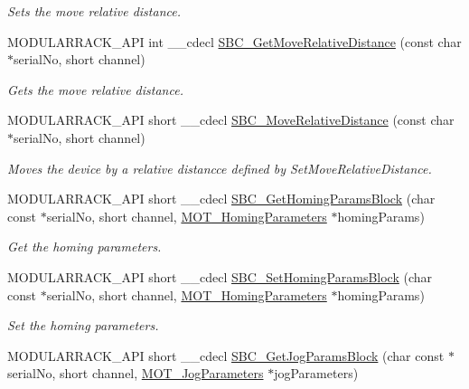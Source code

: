 \begin{DoxyCompactItemize}
\begin{DoxyCompactList}\small\item\em Sets the move relative distance. \end{DoxyCompactList}\item 
M\+O\+D\+U\+L\+A\+R\+R\+A\+C\+K\+\_\+\+A\+PI int \+\_\+\+\_\+cdecl \hyperlink{group___modular_stepper_ga00a86aa314aef711646cb807142b7378}{S\+B\+C\+\_\+\+Get\+Move\+Relative\+Distance} (const char $\ast$serial\+No, short channel)
\begin{DoxyCompactList}\small\item\em Gets the move relative distance. \end{DoxyCompactList}\item 
M\+O\+D\+U\+L\+A\+R\+R\+A\+C\+K\+\_\+\+A\+PI short \+\_\+\+\_\+cdecl \hyperlink{group___modular_stepper_ga51398e8dae554d6f490afdc408dc2abf}{S\+B\+C\+\_\+\+Move\+Relative\+Distance} (const char $\ast$serial\+No, short channel)
\begin{DoxyCompactList}\small\item\em Moves the device by a relative distancce defined by Set\+Move\+Relative\+Distance. \end{DoxyCompactList}\item 
M\+O\+D\+U\+L\+A\+R\+R\+A\+C\+K\+\_\+\+A\+PI short \+\_\+\+\_\+cdecl \hyperlink{group___modular_stepper_ga55b8c605dd67dbfd7c8cc71f8ace7b78}{S\+B\+C\+\_\+\+Get\+Homing\+Params\+Block} (char const $\ast$serial\+No, short channel, \hyperlink{struct_m_o_t___homing_parameters}{M\+O\+T\+\_\+\+Homing\+Parameters} $\ast$homing\+Params)
\begin{DoxyCompactList}\small\item\em Get the homing parameters. \end{DoxyCompactList}\item 
M\+O\+D\+U\+L\+A\+R\+R\+A\+C\+K\+\_\+\+A\+PI short \+\_\+\+\_\+cdecl \hyperlink{group___modular_stepper_ga4aaa7e3e9301948558fe456c71c99f9d}{S\+B\+C\+\_\+\+Set\+Homing\+Params\+Block} (char const $\ast$serial\+No, short channel, \hyperlink{struct_m_o_t___homing_parameters}{M\+O\+T\+\_\+\+Homing\+Parameters} $\ast$homing\+Params)
\begin{DoxyCompactList}\small\item\em Set the homing parameters. \end{DoxyCompactList}\item 
M\+O\+D\+U\+L\+A\+R\+R\+A\+C\+K\+\_\+\+A\+PI short \+\_\+\+\_\+cdecl \hyperlink{group___modular_stepper_gaedd89dd377e3efe69f73fa5373a64ce0}{S\+B\+C\+\_\+\+Get\+Jog\+Params\+Block} (char const $\ast$serial\+No, short channel, \hyperlink{struct_m_o_t___jog_parameters}{M\+O\+T\+\_\+\+Jog\+Parameters} $\ast$jog\+Parameters)

\end{DoxyCompactItemize}

